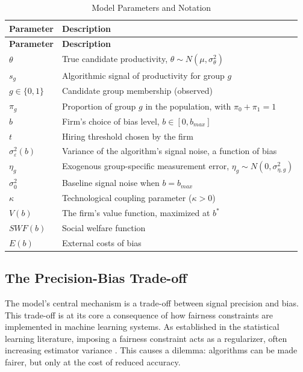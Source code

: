\documentclass[12pt,a4paper]{article}
\theoremstyle{definition}
\theoremstyle{remark}
\begin{document}
\begin{longtable}{@{}ll@{}}
\caption{Model Parameters and Notation}
\label{tab:params}\\
\toprule
\textbf{Parameter} & \textbf{Description} \\ \midrule
\endfirsthead
\toprule
\textbf{Parameter} & \textbf{Description} \\ \midrule
\endhead
\bottomrule
\endfoot
$\theta$ & True candidate productivity, $\theta \sim N(\mu, \sigma_\theta^2)$ \\
$s_g$ & Algorithmic signal of productivity for group $g$ \\
$g \in \{0,1\}$ & Candidate group membership (observed) \\
$\pi_g$ & Proportion of group $g$ in the population, with $\pi_0+\pi_1=1$ \\
$b$ & Firm's choice of bias level, $b \in [0, b_{max}]$ \\
$t$ & Hiring threshold chosen by the firm \\
$\sigma_\varepsilon^2(b)$ & Variance of the algorithm's signal noise, a function of bias \\
$\eta_g$ & Exogenous group-specific measurement error, $\eta_g \sim N(0, \sigma_{\eta,g}^2)$ \\
$\sigma_0^2$ & Baseline signal noise when $b=b_{max}$ \\
$\kappa$ & Technological coupling parameter ($\kappa>0$) \\
$V(b)$ & The firm's value function, maximized at $b^*$ \\
$SWF(b)$ & Social welfare function \\
$E(b)$ & External costs of bias \\
\end{longtable}


\subsection{The Precision-Bias Trade-off}
The model's central mechanism is a trade-off between signal precision and bias. This trade-off is at its core a consequence of how fairness constraints are implemented in machine learning systems. As established in the statistical learning literature, imposing a fairness constraint acts as a regularizer, often increasing estimator variance \citep{Kamishima2012, Wick2019}. This causes a dilemma: algorithms can be made fairer, but only at the cost of reduced accuracy.
\end{document}
